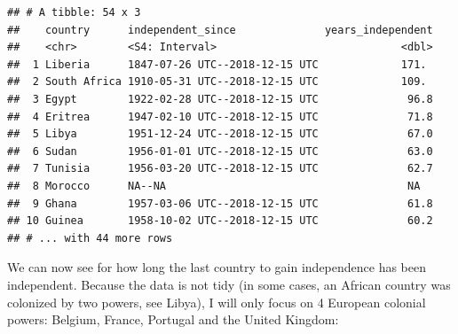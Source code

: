 \documentclass[]{gitbook}
\newenvironment{Shaded}{\begin{snugshade}}{\end{snugshade}}
\newcommand{\DataTypeTok}[1]{\textcolor[rgb]{0.13,0.29,0.53}{#1}}
\newcommand{\KeywordTok}[1]{\textcolor[rgb]{0.13,0.29,0.53}{\textbf{#1}}}
\newcommand{\NormalTok}[1]{#1}
\newcommand{\OperatorTok}[1]{\textcolor[rgb]{0.81,0.36,0.00}{\textbf{#1}}}
\newcommand{\OtherTok}[1]{\textcolor[rgb]{0.56,0.35,0.01}{#1}}
\newcommand{\StringTok}[1]{\textcolor[rgb]{0.31,0.60,0.02}{#1}}
\theoremstyle{definition}
\theoremstyle{definition}
\theoremstyle{definition}
\theoremstyle{remark}
\begin{document}
\begin{verbatim}
## # A tibble: 54 x 3
##    country      independent_since              years_independent
##    <chr>        <S4: Interval>                             <dbl>
##  1 Liberia      1847-07-26 UTC--2018-12-15 UTC             171. 
##  2 South Africa 1910-05-31 UTC--2018-12-15 UTC             109. 
##  3 Egypt        1922-02-28 UTC--2018-12-15 UTC              96.8
##  4 Eritrea      1947-02-10 UTC--2018-12-15 UTC              71.8
##  5 Libya        1951-12-24 UTC--2018-12-15 UTC              67.0
##  6 Sudan        1956-01-01 UTC--2018-12-15 UTC              63.0
##  7 Tunisia      1956-03-20 UTC--2018-12-15 UTC              62.7
##  8 Morocco      NA--NA                                      NA  
##  9 Ghana        1957-03-06 UTC--2018-12-15 UTC              61.8
## 10 Guinea       1958-10-02 UTC--2018-12-15 UTC              60.2
## # ... with 44 more rows
\end{verbatim}

We can now see for how long the last country to gain independence has
been independent. Because the data is not tidy (in some cases, an
African country was colonized by two powers, see Libya), I will only
focus on 4 European colonial powers: Belgium, France, Portugal and the
United Kingdom:

\begin{Shaded}
\end{Shaded}
\end{document}
